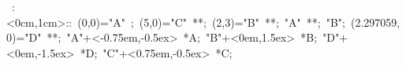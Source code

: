 %

\hbox{
\xy    <1cm,0cm>:<0cm,1cm>::
       (0,0)="A" ; (5,0)="C" **\dir{-};  %
       (2,3)="B" **\dir{-};  "A" **\dir{-}; "B";
       (2.297059,0)="D" **\dir{-};  
       "A"+<-0.75em,-0.5ex> *{A};
       "B"+<0em,1.5ex> *{B};
       "D"+<0em,-1.5ex> *{D};
       "C"+<0.75em,-0.5ex> *{C};
       \endxy}
	   


